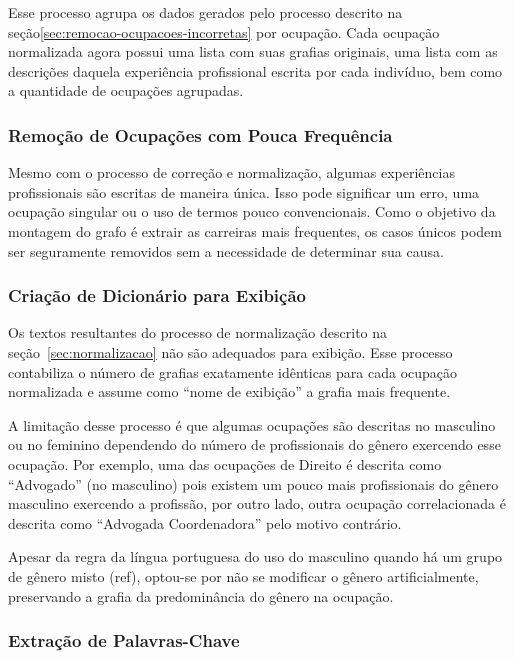\documentclass[12pt,a4paper]{article}
\theoremstyle{hypo}
\begin{document}
Esse processo agrupa os dados gerados pelo processo descrito na seção\ref{sec:remocao-ocupacoes-incorretas} por ocupação. Cada ocupação normalizada agora possui uma lista com suas grafias originais, uma lista com as descrições daquela experiência profissional escrita por cada indivíduo, bem como a quantidade de ocupações agrupadas.

\subsubsection{Remoção de Ocupações com Pouca Frequência}

Mesmo com o processo de correção e normalização, algumas experiências profissionais são escritas de maneira única. Isso pode significar um erro, uma ocupação singular ou o uso de termos pouco convencionais. Como o objetivo da montagem do grafo é extrair as carreiras mais frequentes, os casos únicos podem ser seguramente removidos sem a necessidade de determinar sua causa.

\subsubsection{Criação de Dicionário para Exibição} \label{sec:criar-dicionario}

Os textos resultantes do processo de normalização descrito na seção~\ref{sec:normalizacao} não são adequados para exibição. Esse processo contabiliza o número de grafias exatamente idênticas para cada ocupação normalizada e assume como \enquote{nome de exibição} a grafia mais frequente.

A limitação desse processo é que algumas ocupações são descritas no masculino ou no feminino dependendo do número de profissionais do gênero exercendo esse ocupação. Por exemplo, uma das ocupações de Direito é descrita como \enquote{Advogado} (no masculino) pois existem um pouco mais profissionais do gênero masculino exercendo a profissão, por outro lado, outra ocupação correlacionada é descrita como \enquote{Advogada Coordenadora} pelo motivo contrário.

Apesar da regra da língua portuguesa do uso do masculino quando há um grupo de gênero misto (ref), optou-se por não se modificar o gênero artificialmente, preservando a grafia da predominância do gênero na ocupação.

\subsubsection{Extração de Palavras-Chave}
\end{document}

